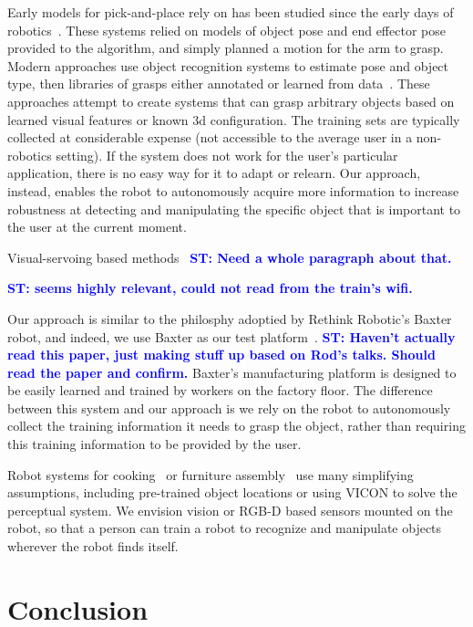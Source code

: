 \documentclass[conference]{IEEEtran}
\newcommand{\stnote}[1]{\textcolor{Blue}{\textbf{ST: #1}}}
\begin{document}
Early models for pick-and-place rely on has been studied since the
early days of robotics~\citep{brooks83, lozano89}.  These systems
relied on models of object pose and end effector pose provided to the
algorithm, and simply planned a motion for the arm to grasp.  Modern
approaches use object recognition systems to estimate pose and object
type, then libraries of grasps either annotated or learned from
data~\citep{saxena08, goldfeder09, morales03}.  These approaches
attempt to create systems that can grasp arbitrary objects based on
learned visual features or known 3d configuration.  The training sets
are typically collected at considerable expense (not accessible to the
average user in a non-robotics setting).  If the system does not work
for the user's particular application, there is no easy way for it to
adapt or relearn.  Our approach, instead, enables the robot to
autonomously acquire more information to increase robustness at
detecting and manipulating the specific object that is important to
the user at the current moment.

Visual-servoing based methods~\citep{chaumette06} \stnote{Need a whole
  paragraph about that. }

\stnote{\citet{ciocarlie14} seems highly relevant, could not read from
  the train's wifi.}

Our approach is similar to the philosphy adoptied by Rethink Robotic's
Baxter robot, and indeed, we use Baxter as our test
platform~\citep{fitzgerald13}.  \stnote{Haven't actually read this
  paper, just making stuff up based on Rod's talks.  Should read the
  paper and confirm.}  Baxter's manufacturing platform is designed to
be easily learned and trained by workers on the factory floor.  The
difference between this system and our approach is we rely on the
robot to autonomously collect the training information it needs to
grasp the object, rather than requiring this training information to
be provided by the user.


Robot systems for cooking~\citep{bollini12, beetz11} or furniture
assembly~\citep{knepper13} use many simplifying assumptions, including
pre-trained object locations or using VICON to solve the perceptual
system.  We envision vision or RGB-D based sensors mounted on the
robot, so that a person can train a robot to recognize and manipulate
objects wherever the robot finds itself.


\section{Conclusion}
\end{document}
